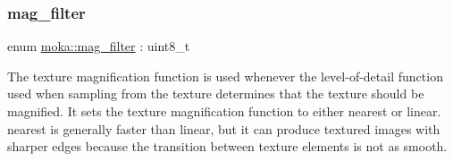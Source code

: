 \subsubsection{\texorpdfstring{mag\_filter}{mag\_filter}\hspace{0.1cm}{\footnotesize\ttfamily [2/2]}}
{\footnotesize\ttfamily enum \mbox{\hyperlink{namespacemoka_a2391e4ae99494b70d0226ee0e586f33c}{moka\+::mag\+\_\+filter}} \+: uint8\+\_\+t\hspace{0.3cm}{\ttfamily [strong]}}



The texture magnification function is used whenever the level-\/of-\/detail function used when sampling from the texture determines that the texture should be magnified. It sets the texture magnification function to either nearest or linear. nearest is generally faster than linear, but it can produce textured images with sharper edges because the transition between texture elements is not as smooth. 

